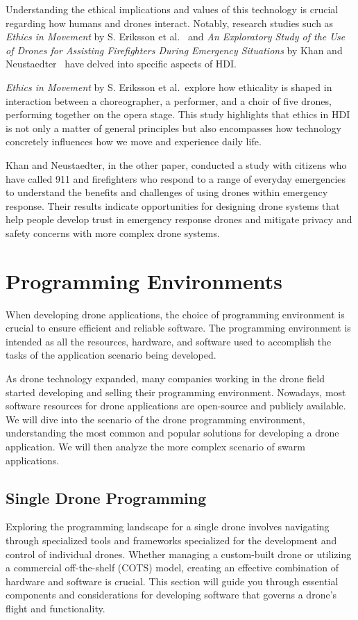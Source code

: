Understanding the ethical implications and values of this technology is crucial regarding how humans and drones interact. 
Notably, research studies such as \textit{Ethics in Movement} by S. Eriksson et al.~\cite{eriksson2020ethicsInMovement} and 
\textit{An Exploratory Study of the Use of Drones for Assisting Firefighters During Emergency Situations} by Khan and Neustaedter~\cite{khan2019exploratory} have delved into specific aspects of HDI.

\textit{Ethics in Movement} by S. Eriksson et al.\ explore how ethicality is shaped in interaction between a choreographer, a performer, and a choir of five drones, performing together on the opera stage.
This study highlights that ethics in HDI is not only a matter of general principles but also encompasses how technology concretely influences how we move and experience daily life.

Khan and Neustaedter, in the other paper, conducted a study with citizens who have called 911 and firefighters who respond to a range of everyday emergencies to understand the benefits and challenges of using drones within emergency response.
Their results indicate opportunities for designing drone systems that help people develop trust in emergency response drones and mitigate privacy and safety concerns with more complex drone systems.


\section{Programming Environments}\label{sec:soa_programming_environments}
When developing drone applications, the choice of programming environment is crucial to ensure efficient and reliable software.
The programming environment is intended as all the resources, hardware, and software used to accomplish the tasks of the 
application scenario being developed.

As drone technology expanded, many companies working in the drone field started developing and selling their programming environment. 
Nowadays, most software resources for drone applications are open-source and publicly available. 
We will dive into the scenario of the drone programming environment, understanding the most common and popular solutions 
for developing a drone application. We will then analyze the more complex scenario of swarm applications.

\subsection{Single Drone Programming}\label{subsec:programming_environments_single}
Exploring the programming landscape for a single drone involves navigating through specialized tools and 
frameworks specialized for the development and control of individual drones. 
Whether managing a custom-built drone or utilizing a commercial off-the-shelf (COTS) model, 
creating an effective combination of hardware and software is crucial. 
This section will guide you through essential components and considerations for developing software that governs a 
drone's flight and functionality.


